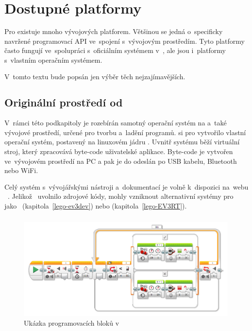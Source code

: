 \chapter{Dostupné platformy}

\label{lego-soft-available-platforms}


Pro \legoEV{} existuje mnoho vývojových platforem. 
Většinou se jedná o~specificky navržené programovací API ve~spojení s~vývojovým prostředím. 
Tyto platformy často fungují ve~spolupráci s~oficiálním systémem v~\EVthree{}, ale jsou i~platformy s~vlastním operačním systémem. 

V~tomto textu bude popsán jen výběr těch nejzajímavějších. %

\section{Originální prostředí od \lego}

V~rámci této podkapitoly je rozebírán samotný operační systém na \EVthree{} a~také vývojové prostředí, určené pro tvorbu a~ladění programů. 
\lego{} si pro \EVthree{} vytvořilo vlastní operační systém, postavený na linuxovém jádru \cite{legoMindstormsEV3_fw-dev-kit}. 
Uvnitř systému běží virtuální stroj, který zpracovává byte-code uživatelské aplikace. 
Byte-code je vytvořen ve~vývojovém prostředí na PC a pak je do  odeslán po USB kabelu, Bluetooth nebo WiFi.

Celý systém s~vývojářskými nástroji a~dokumentací je volně k~dispozici na~webu \lego{}~\cite{legoMindstorms_download}. Jelikož~\lego{} uvolnilo zdrojové kódy, mohly vzniknout alternativní systémy pro~\EVthree{} jako~\evThreeDev{} (kapitola~\ref{lego-ev3dev}) nebo \evRT{} (kapitola~\ref{lego-EV3RT}). 

\subsection{\legoSW{}}
\label{lego-soft-orig-problems}


\begin{figure}[h]
	\centering
	\includegraphics[width=0.99\textwidth]{images/lego-soft_robotut_switch-touch+motors+leds.png}
	\caption{Ukázka programovacích bloků v~\legoSW}
	\label{fig:lego-soft_example-blocks}
\end{figure}

